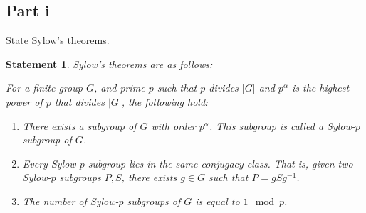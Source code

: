 \documentclass[12pt,reqno]{amsart}
\newcommand{\inv}{^{-1}}
\newtheorem*{statement}{Statement}
\begin{document}
\subsection*{Part i}
State Sylow's theorems.
\\
\begin{statement}
Sylow's theorems are as follows:

    For a finite group $G$, and prime $p$ such that $p$ divides $|G|$ and
    $p^{\alpha}$ is the highest power of $p$ that divides $|G|$, the following
    hold:
    \begin{enumerate}
        \item There exists a subgroup of $G$ with order $p^{\alpha}$. This
            subgroup is called a Sylow-$p$ subgroup of $G$.
        \item Every Sylow-$p$ subgroup lies in the same conjugacy class. That
            is, given two Sylow-$p$ subgroups $P,S$, there exists $g\in G$ such
            that $P=gSg\inv$.
        \item The number of Sylow-$p$ subgroups of $G$ is equal to $1\mod p$.
    \end{enumerate}

\end{statement}
\end{document}
